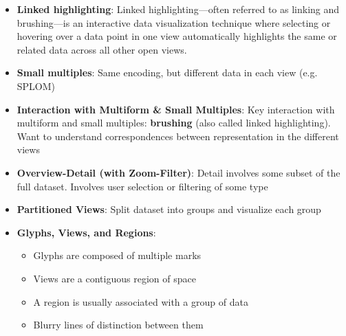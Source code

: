\documentclass{report}
\begin{document}
\begin{itemize}
\begin{itemize}
                \item Consumes more screen space
                \item Allows greater separability between channels
            \end{itemize}
        \item \textbf{Linked highlighting}: Linked highlighting—often referred to as linking and brushing—is an interactive data visualization technique where selecting or hovering over a data point in one view automatically highlights the same or related data across all other open views.
        \item \textbf{Small multiples}: Same encoding, but different data in each view (e.g. SPLOM)
        \item \textbf{Interaction with Multiform \& Small Multiples}: Key interaction with multiform and small multiples: \textbf{brushing} (also called linked highlighting). Want to understand correspondences between representation in the different views
        \item \textbf{Overview-Detail (with Zoom-Filter)}: Detail involves some subset of the full dataset. Involves user selection or filtering of some type
        \item \textbf{Partitioned Views}: Split dataset into groups and visualize each group
        \item \textbf{Glyphs, Views, and Regions}: 
            \begin{itemize}
                \item Glyphs are composed of multiple marks
                \item Views are a contiguous region of space
                \item A region is usually associated with a group of data
                \item Blurry lines of distinction between them
            \end{itemize}




    \end{itemize}

    \pagebreak 
\end{document}

